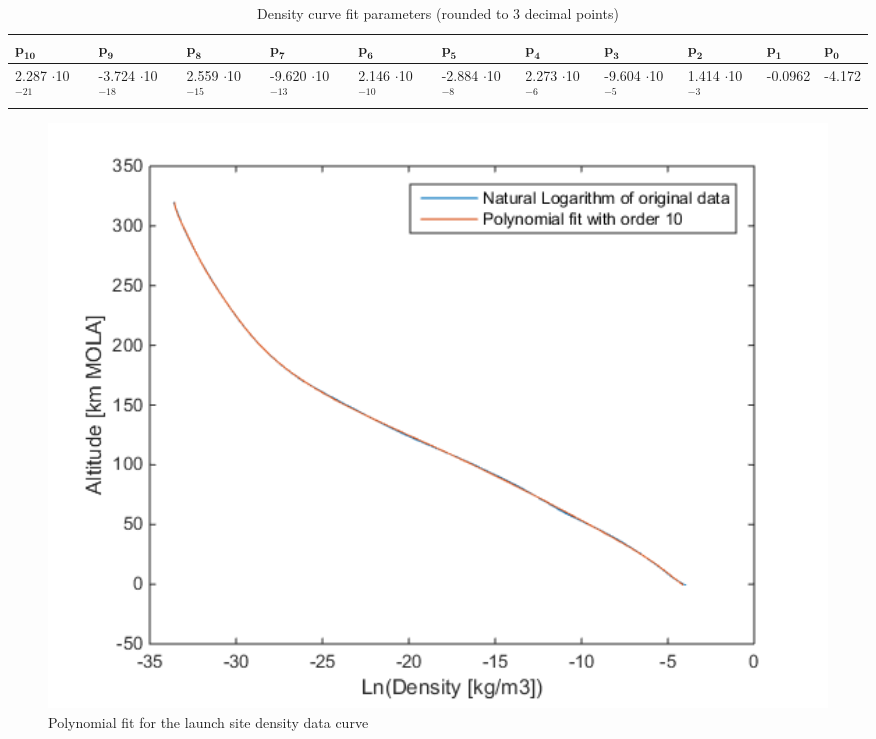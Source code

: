 \begin{table}[!ht]
\begin{center}
\caption{Density curve fit parameters (rounded to 3 decimal points)}
\label{tab:fitParametersDen}
\begin{tabular}{|p{1.1cm}|p{1.1cm}|p{1.1cm}|p{1.1cm}|p{1.1cm}|p{1.1cm}|p{1.1cm}|p{1.1cm}|p{1.1cm}|p{1.1cm}|p{1.1cm}|}
\hline 
 $\mathbf{p_{10}}$ & $\mathbf{p_{9}}$ & $\mathbf{p_{8}}$ & $\mathbf{p_{7}}$ & $\mathbf{p_{6}}$ & $\mathbf{p_{5}}$ & $\mathbf{p_{4}}$ & $\mathbf{p_{3}}$ & $\mathbf{p_{2}}$ & $\mathbf{p_{1}}$ & $\mathbf{p_{0}}$ \\ \hline 
2.287 $\cdot$10$^{-21}$  & -3.724 $\cdot$10$^{-18}$ & 2.559 $\cdot$10$^{-15}$ & -9.620 $\cdot$10$^{-13}$ & 2.146 $\cdot$10$^{-10}$ & -2.884 $\cdot$10$^{-8}$ & 2.273 $\cdot$10$^{-6}$ & -9.604 $\cdot$10$^{-5}$ & 1.414 $\cdot$10$^{-3}$ & -0.0962 & -4.172\\ \hline
\end{tabular}
\end{center}
\end{table}



\begin{figure}[!ht]
\centering
\includegraphics[width=1.0\textwidth]{figures/software/completeExpPolyFitDen.png}
\caption{Polynomial fit for the launch site density data curve}
\label{fig:completeExpPolyFitDen}
\end{figure}

